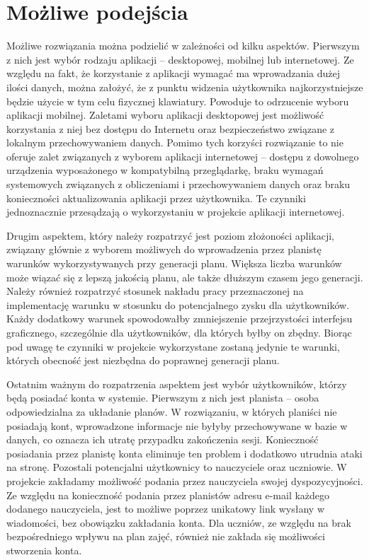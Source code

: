 \section{Możliwe podejścia}
Możliwe rozwiązania można podzielić w zależności od kilku aspektów. Pierwszym z nich jest wybór rodzaju aplikacji -- desktopowej, mobilnej lub internetowej. Ze względu na fakt, że korzystanie z aplikacji wymagać ma wprowadzania dużej ilości danych, można założyć, że z punktu widzenia użytkownika najkorzystniejsze będzie użycie w tym celu fizycznej klawiatury. Powoduje to odrzucenie wyboru aplikacji mobilnej. Zaletami  wyboru aplikacji desktopowej jest możliwość korzystania z niej bez dostępu do Internetu oraz bezpieczeństwo związane z lokalnym przechowywaniem danych. Pomimo tych korzyści rozwiązanie to nie oferuje zalet związanych z wyborem aplikacji internetowej -- dostępu z dowolnego urządzenia wyposażonego w kompatybilną przeglądarkę, braku wymagań systemowych związanych z obliczeniami i przechowywaniem danych oraz braku konieczności aktualizowania aplikacji przez użytkownika. Te czynniki jednoznacznie przesądzają o wykorzystaniu w projekcie aplikacji internetowej.

Drugim aspektem, który należy rozpatrzyć jest poziom złożoności aplikacji, związany głównie z wyborem możliwych do wprowadzenia przez planistę warunków wykorzystywanych przy generacji planu. Większa liczba warunków może wiązać się z lepszą jakością planu, ale także dłuższym czasem jego generacji. Należy również rozpatrzyć stosunek nakładu pracy przeznaczonej na implementację warunku w stosunku do potencjalnego zysku dla użytkowników. Każdy dodatkowy warunek spowodowałby zmniejszenie przejrzystości interfejsu graficznego, szczególnie dla użytkowników, dla których byłby on zbędny. Biorąc pod uwagę te czynniki w projekcie wykorzystane zostaną jedynie te warunki, których obecność jest niezbędna do poprawnej generacji planu.

Ostatnim ważnym do rozpatrzenia aspektem jest wybór użytkowników, którzy będą posiadać konta w systemie. Pierwszym z nich jest planista -- osoba odpowiedzialna za układanie planów. W rozwiązaniu, w których planiści nie posiadają kont, wprowadzone informacje nie byłyby przechowywane w bazie w danych, co oznacza ich utratę przypadku zakończenia sesji. Konieczność posiadania przez planistę konta eliminuje ten problem i dodatkowo utrudnia ataki na stronę. Pozostali potencjalni użytkownicy to nauczyciele oraz uczniowie. W projekcie zakładamy możliwość podania przez nauczyciela swojej dyspozycyjności. Ze względu na konieczność podania przez planistów adresu e-mail każdego dodanego nauczyciela, jest to możliwe poprzez unikatowy link wysłany w wiadomości, bez obowiązku zakładania konta. Dla uczniów, ze względu na brak bezpośredniego wpływu na plan zajęć, również nie zakłada się możliwości stworzenia konta. 
